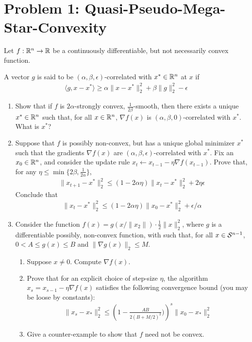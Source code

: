 \documentclass[12pt]{article}
\begin{document}
\section*{Problem 1: Quasi-Pseudo-Mega-Star-Convexity}
	Let $f: \mathbb{R}^n \to \mathbb{R}$ be a continuously differentiable, but not necessarily convex function. 
	\begin{definition}[Correlation] A vector $g$ is said to be $(\alpha,\beta,\epsilon)$-correlated with $x^* \in \mathbb{R}^n$ at $x$ if
	\begin{eqnarray}
	\langle g, x - x^* \rangle \ge \alpha \|x-x^*\|_2^2 + \beta \|g\|_2^2 - \epsilon
	\end{eqnarray}
	\end{definition}
	\begin{enumerate}
		\item Show that if $f$ is $2\alpha$-strongly convex, $\frac{1}{2\beta}$-smooth, then there exists a unique $x^* \in \mathbb{R}^n$ such that, for all $x \in \mathbb{R}^n$, $\nabla f(x)$ is $(\alpha,\beta,0)$-correlated with $x^*$. What is $x^*$?
		\item Suppose that $f$ is possibly non-convex, but has a unique global minimizer $x^*$ such that the gradients $\nabla f(x)$ are $(\alpha,\beta,\epsilon)$-correlated with $x^*$. Fix an $x_0 \in \mathbb{R}^n$, and consider the update rule $x_t \leftarrow x_{t-1} - \eta \nabla f(x_{t-1})$. Prove that, for any $\eta \le \min\{2\beta,\frac{1}{2\alpha}\}$,
		\begin{eqnarray}
		\|x_{t+1} - x^*\|_2^2 \le (1-2\alpha \eta)\|x_{t} - x^*\|_2^2 + 2\eta \epsilon
		\end{eqnarray}
		Conclude that 
		\begin{eqnarray}
		\|x_{t} - x^*\|_2^2 \le (1-2\alpha \eta)\|x_{0} - x^*\|_2^2 + \epsilon/\alpha
		\end{eqnarray}
		\item Consider the function $f(x) = g(x/\|x_2\|) \cdot \frac{1}{2}\|x\|_2^2$, where $g$ is a differentiable possibly, non-convex function, with such that, for all $x \in {\cal S}^{n-1}$, $0 < A \le g(x) \le B$ and $\|\nabla g(x)\|_2 \le M$. 
		\begin{enumerate}
			\item Suppose $x \ne 0$. Compute $\nabla f(x)$. 
			\item Prove that for an explicit choice of step-size $\eta$, the algorithm $x_{s} = x_{s-1} - \eta \nabla f(x)$ satisfies the following convergence bound (you may be loose by constants):
			\begin{eqnarray}
			\|x_s - x_*\|_2^2 \le \left(1 - \frac{AB}{2(B+M/2)^2})\right)^s \|x_0 - x_*\|_2^2
			\end{eqnarray}
			\item Give a counter-example to show that $f$ need not be convex.
		\end{enumerate} 

	\end{enumerate}
\end{document}
